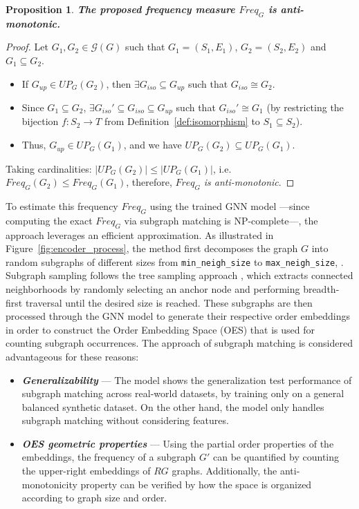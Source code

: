\documentclass[pdflatex,sn-mathphys-num]{sn-jnl}%
\theoremstyle{thmstyleone}%
\newtheorem{proposition}[theorem]{Proposition}%
\theoremstyle{thmstyletwo}%
\theoremstyle{thmstylethree}%
\begin{document}
\vspace{13pt}
\begin{proposition}
\textbf{The proposed frequency measure $Freq_G$ is anti-monotonic.}
\label{prop:antimonotonicity}
\end{proposition}

\begin{proof}
Let $G_1, G_2 \in \mathcal{G}(G)$ such that $G_1=(S_1, E_1)$, $G_2=(S_2, E_2)$ and $G_1 \subseteq G_2$.
\begin{itemize}
    \item If $G_{up} \in UP_G(G_2)$, then $\exists G_{iso} \subseteq G_{up}$ such that $G_{iso} \cong G_2$.
    \item Since $G_1 \subseteq G_2$, $\exists G_{iso}' \subseteq G_{iso} \subseteq G_{up}$ such that $G_{iso}' \cong G_1$ (by restricting the bijection $f: S_2 \to T$ from Definition~\ref{def:isomorphism} to $S_1 \subseteq S_2$).
    \item Thus, $G_{up} \in UP_G(G_1)$, and we have $UP_G(G_2) \subseteq UP_G(G_1)$.
\end{itemize}
Taking cardinalities: $|UP_G(G_2)| \leq |UP_G(G_1)|$, i.e. $Freq_G(G_2) \leq Freq_G(G_1)$, therefore, $Freq_G$ \textit{is anti-monotonic}.
\end{proof}
\vspace{5pt}

To estimate this frequency $Freq_G$ using the trained GNN model —since computing the exact $Freq_G$ via subgraph matching is NP-complete—, the approach leverages an efficient approximation. As illustrated in Figure~\ref{fig:encoder_process}, the method first decomposes the graph $G$ into random subgraphs  of different sizes from \texttt{min\_neigh\_size} to \texttt{max\_neigh\_size}, . Subgraph sampling follows the tree sampling approach \cite{kashtan2004efficient}, which extracts connected neighborhoods by randomly selecting an anchor node and performing breadth-first traversal until the desired size is reached. These subgraphs are then processed through the GNN model to generate their respective order embeddings in order to construct the Order Embedding Space (OES) that is used for counting subgraph occurrences. The approach of subgraph matching is considered advantageous for these reasons:

\begin{itemize}
    \item \textbf{\textit{Generalizability}} --- The model shows the generalization test performance of subgraph matching across real-world datasets, by training only on a general balanced synthetic dataset. On the other hand, the model only handles subgraph matching without considering features.
    \item \textbf{\textit{OES geometric properties}} --- Using the partial order properties of the embeddings, the frequency of a subgraph $G'$ can be quantified by counting the upper-right embeddings of $RG$ graphs. Additionally, the anti-monotonicity property can be verified by how the space is organized according to graph size and order.
\end{itemize}
\end{document}
